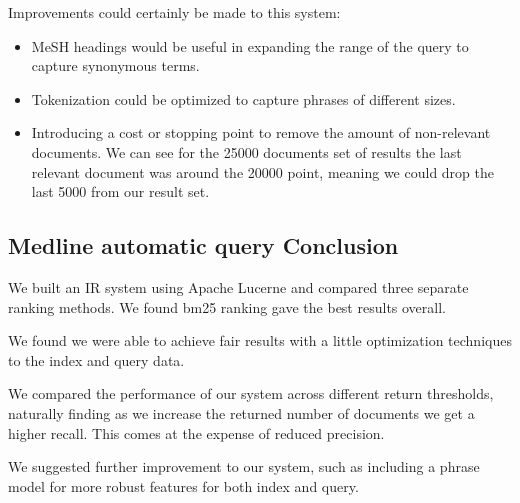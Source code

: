 Improvements could certainly be made to this system:

\begin{itemize}
  \item MeSH headings would be useful in expanding the range of the query to capture synonymous terms. 
  \item Tokenization could be optimized to capture phrases of different sizes.
  \item Introducing a cost or stopping point to remove the amount of non-relevant documents. We can see for the 25000 documents set of results the last relevant document was around the 20000 point, meaning we could drop the last 5000 from our result set.
\end{itemize}


\subsection{Medline automatic query Conclusion}


We built an IR system using Apache Lucerne and compared three separate ranking methods. We found bm25 ranking gave the best results overall.

We found we were able to achieve fair results with a little optimization techniques to the index and query data.

We compared the performance of our system across different return thresholds, naturally finding as we increase the returned number of documents we get a higher recall. This comes at the expense of reduced precision.

We suggested further improvement to our system, such as including a phrase model for more robust features for both index and query.



